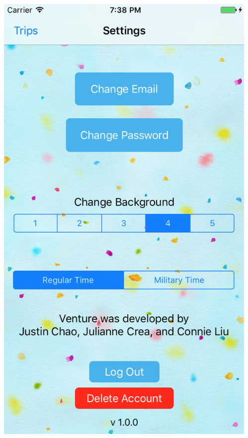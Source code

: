 \documentclass{beamer}
\begin{document}
\begin{frame}
\begin{columns}
\begin{column}{0.3\textwidth}
\begin{center}
        \end{center}
    \end{column}
    \begin{column}{0.3\textwidth}  %
        \begin{center}
            \includegraphics[scale=0.3]{settings2}
        \end{center}
    \end{column}
\end{columns}
\end{frame}
\end{document}
